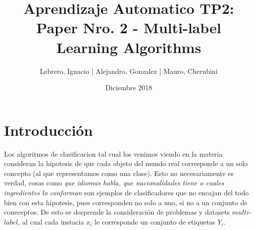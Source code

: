 \documentclass{article}
\title{Aprendizaje Automatico TP2: Paper Nro. 2 - Multi-label Learning Algorithms}
\author{ Lebrero, Ignacio | Alejandro, Gonzalez | Mauro, Cherubini }
\date{Diciembre 2018}
\begin{document}
\normalsize

\maketitle

\section{Introducción}
    Los algoritmos de clasificacion tal cual los venimos viendo en la materia consideran la hipotesis de que cada objeto del mundo real corresponde a un solo concepto (al que representamos como una clase). Esto no necesariamente es verdad, cosas como \textit{que idiomas habla, que nacionalidades tiene o cuales ingredientes lo conforman} son ejemplos de clasificadores que no encajan del todo bien con esta hipotesis, pues corresponden no solo a uno, si no a un conjunto de coneceptos. De esto se desprende la consideración de problemas y datasets $multi$-$label$, al cual cada instacia $x_i$ le corresponde un conjunto de etiquetas $Y_i$. 
    
        
        
        
\end{document}
